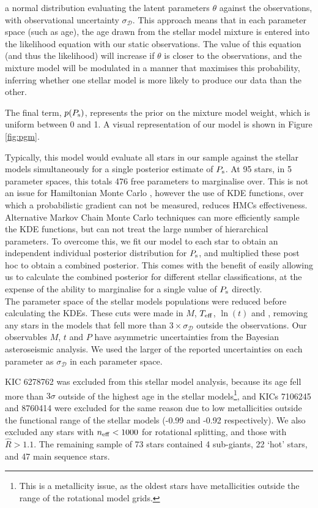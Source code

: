 \noindent a normal distribution evaluating the latent parameters $\theta$ against the observations, with observational uncertainty $\sigma_{\mathcal{D}}$. This approach means that in each parameter space (such as age), the age drawn from the stellar model mixture is entered into the likelihood equation with our static observations. The value of this equation (and thus the likelihood) will increase if $\theta$ is closer to the observations, and the mixture model will be modulated in a manner that maximises this probability, inferring whether one stellar model is more likely to produce our data than the other.

The final term, $p(P_{\rm s})$, represents the prior on the mixture model weight, which is uniform between 0 and 1. A visual representation of our model is shown in Figure \ref{fig:pgm}.

Typically, this model would evaluate all stars in our sample against the stellar models simultaneously for a single posterior estimate of $P_{\rm s}$. At 95 stars, in 5 parameter spaces, this totals 476 free parameters to marginalise over. This is not an issue for Hamiltonian Monte Carlo \cite[HMC]{betancourt+girolami2013}, however the use of KDE functions, over which a probabilistic gradient can not be measured, reduces HMCs effectiveness. Alternative Markov Chain Monte Carlo techniques \cite[MCMC]{foreman-mackey+2013} can more efficiently sample the KDE functions, but can not treat the large number of hierarchical parameters. To overcome this, we fit our model to each star to obtain an independent individual posterior distribution for $P_{\rm s}$, and multiplied these post hoc to obtain a combined posterior. This comes with the benefit of easily allowing us to calculate the combined posterior for different stellar classifications, at the expense of the ability to marginalise for a single value of $P_{\rm s}$ directly.\\

The parameter space of the stellar models populations were reduced before calculating the KDEs. These cuts were made in $M$, $\mbox{$T_{\rm eff}$}$, $\ln(t)$ and \feh, removing any stars in the models that fell more than $3 \times \sigma_{\mathcal{D}}$ outside the observations. Our observables $M$, $t$ and $P$ have asymmetric uncertainties from the Bayesian asteroseismic analysis. We used the larger of the reported uncertainties on each parameter as $\sigma_{\mathcal{D}}$ in each parameter space. 

KIC 6278762 was excluded from this stellar model analysis, because its age fell more than $3\sigma$ outside of the highest age in the stellar models\footnote{This is a metallicity issue, as the oldest stars have metallicities outside the range of the rotational model grids.}, and KICs 7106245 and 8760414 were excluded for the same reason due to low metallicities outside the functional range of the stellar models (-0.99 and -0.92 respectively). We also excluded any stars with $n_{\rm eff} < 1000$ for rotational splitting, and those with $\hat{R} > 1.1$. The remaining sample of 73 stars contained 4 sub-giants, 22 `hot' stars, and 47 main sequence stars.

